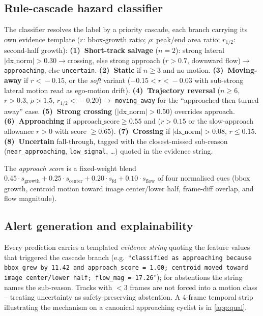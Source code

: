 \documentclass[10pt,twocolumn,letterpaper]{article}
\begin{document}
\subsection{Rule-cascade hazard classifier}
\label{sec:classifier}

The classifier resolves the label by a priority cascade, each branch
carrying its own evidence template ($r$: bbox-growth ratio;
$\rho$: peak/end area ratio; $r_{1/2}$: second-half growth):
\textbf{(1)~Short-track salvage} ($n\!=\!2$): strong lateral
$|\textrm{dx\_norm}|\!>\!0.30\to$crossing, else strong approach
($r\!>\!0.7$, downward flow)$\to$\texttt{approaching}, else
\texttt{uncertain}. \textbf{(2)~Static} if $n\!\ge\!3$ and no motion.
\textbf{(3)~Moving-away} if $r\!<\!-0.15$, or the \emph{soft} variant
($-0.15\!<\!r\!<\!-0.03$ with sub-strong lateral motion read as
ego-motion drift). \textbf{(4)~Trajectory reversal} ($n\!\ge\!6$,
$r\!>\!0.3$, $\rho\!>\!1.5$, $r_{1/2}\!<\!-0.20$)$\to$
\texttt{moving\_away} for the ``approached then turned away'' case.
\textbf{(5)~Strong crossing} ($|\textrm{dx\_norm}|\!>\!0.50$)
overrides approach. \textbf{(6)~Approaching} if
$\textrm{approach\_score}\!\ge\!0.55$ and ($r\!>\!0.15$ or the
slow-approach allowance $r\!>\!0$ with score $\ge\!0.65$).
\textbf{(7)~Crossing} if $|\textrm{dx\_norm}|\!>\!0.08$, $r\!\le\!0.15$.
\textbf{(8)~Uncertain} fall-through, tagged with the closest-missed
sub-reason (\texttt{near\_approaching}, \texttt{low\_signal}, \dots)
quoted in the evidence string.

\noindent The \emph{approach score} is a fixed-weight blend
$0.45\cdot s_{\textrm{growth}}+0.25\cdot s_{\textrm{center}}+
0.20\cdot s_{\textrm{fd}}+0.10\cdot s_{\textrm{flow}}$ of four
normalised cues (bbox growth, centroid motion toward image
center/lower half, frame-diff overlap, and flow magnitude).

\subsection{Alert generation and explainability}
Every prediction carries a templated \emph{evidence string} quoting
the feature values that triggered the cascade branch
(e.g.\ ``\texttt{classified as approaching because bbox grew by 11.42
and approach\_score = 1.00; centroid moved toward image
center/lower half; flow\_mag = 17.26}''); for abstentions the string
names the sub-reason. Tracks with $<\!3$ frames are not forced into
a motion class -- treating uncertainty as safety-preserving
abstention. A 4-frame temporal strip illustrating the mechanism on a
canonical approaching cyclist is in \cref{app:qual}.
\end{document}
